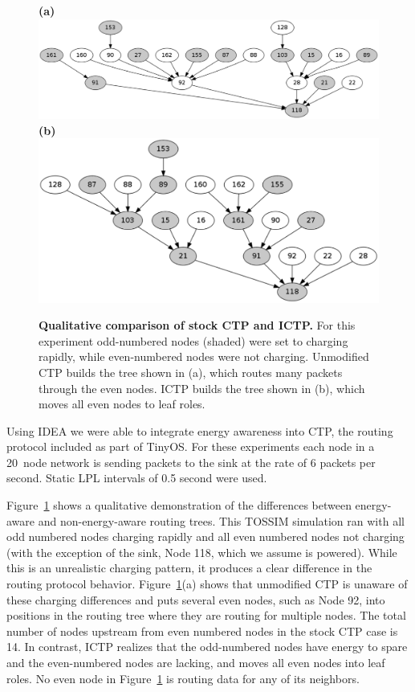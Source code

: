 \begin{figure}[t]
\begin{center}
\textbf{(a)}\\
\includegraphics[width=0.7\hsize]{./5-idea/figs/ctp.pdf}\\
\textbf{(b)}\\
\includegraphics[width=0.7\hsize]{./5-idea/figs/ictp.pdf}\\
\end{center}

\caption{\textbf{Qualitative comparison of stock CTP and ICTP.} For this
experiment odd-numbered nodes (shaded) were set to charging rapidly, while
even-numbered nodes were not charging. Unmodified CTP builds the tree shown
in (a), which routes many packets through the even nodes. ICTP builds the
tree shown in (b), which moves all even nodes to leaf roles.}

\label{idea-fig-ictpqualitative}
\end{figure}

Using IDEA we were able to integrate energy awareness into CTP, the routing
protocol included as part of TinyOS. For these experiments each node in a
20~node network is sending packets to the sink at the rate of 6 packets per
second. Static LPL intervals of 0.5 second were used. 

Figure~\ref{idea-fig-ictpqualitative} shows a qualitative demonstration of
the differences between energy-aware and non-energy-aware routing trees. This
TOSSIM simulation ran with all odd numbered nodes charging rapidly and all
even numbered nodes not charging (with the exception of the sink, Node 118,
which we assume is powered). While this is an unrealistic charging pattern,
it produces a clear difference in the routing protocol behavior.
Figure~\ref{idea-fig-ictpqualitative}(a) shows that unmodified CTP is unaware
of these charging differences and puts several even nodes, such as Node 92,
into positions in the routing tree where they are routing for multiple nodes.
The total number of nodes upstream from even numbered nodes in the stock CTP
case is 14. In contrast, ICTP realizes that the odd-numbered nodes have
energy to spare and the even-numbered nodes are lacking, and moves all even
nodes into leaf roles. No even node in Figure~\ref{idea-fig-ictpqualitative}
is routing data for any of its neighbors.

